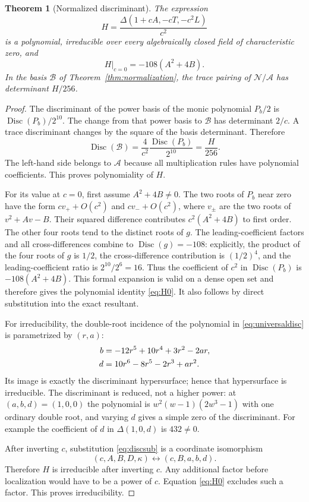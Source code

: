 \documentclass[11pt,a4paper]{article}
\newtheorem{theorem}{Theorem}[section]
\theoremstyle{definition}
\newcommand{\Disc}{\operatorname{Disc}}
\newcommand{\base}{\mathcal A}
\newcommand{\normal}{\mathcal N}
\newcommand{\kk}{\kappa}
\begin{document}
\begin{theorem}[Normalized discriminant]\label{thm:H}
The expression
\begin{equation}\label{eq:H}
 H=\frac{\Delta(1+cA,-cT,-c^2L)}{c^2}
\end{equation}
is a polynomial, irreducible over every algebraically closed field of
characteristic zero, and
\begin{equation}\label{eq:H0}
 H|_{c=0}=-108(A^2+4B).
\end{equation}
In the basis $\mathcal B$ of Theorem~\ref{thm:normalization}, the trace
pairing of $\normal/\base$ has determinant $H/256$.
\end{theorem}
\begin{proof}
The discriminant of the power basis of the monic polynomial $P_b/2$ is
$\Disc(P_b)/2^{10}$. The change from that power basis to $\mathcal B$
has determinant $2/c$. A trace discriminant changes by the square of
the basis determinant. Therefore
\begin{equation}\label{eq:discbasis}
 \Disc(\mathcal B)=\frac{4}{c^2}\frac{\Disc(P_b)}{2^{10}}
                 =\frac{H}{256}.
\end{equation}
The left-hand side belongs to $\base$ because all multiplication rules
have polynomial coefficients. This proves polynomiality of $H$.

For its value at $c=0$, first assume $A^2+4B\ne0$. The two roots of $P_b$
near zero have the form $cv_++O(c^2)$ and $cv_-+O(c^2)$, where
$v_\pm$ are the two roots of $v^2+Av-B$. Their squared difference
contributes $c^2(A^2+4B)$ to first order. The other four roots tend to
the distinct roots of $g$. The leading-coefficient factors and all
cross-differences combine to $\Disc(g)=-108$: explicitly, the product
of the four roots of $g$ is $1/2$, the cross-difference contribution is
$(1/2)^4$, and the leading-coefficient ratio is $2^{10}/2^6=16$.
Thus the coefficient of $c^2$ in $\Disc(P_b)$ is
$-108(A^2+4B)$. This formal expansion is valid on a dense open set and
therefore gives the polynomial identity \eqref{eq:H0}. It also follows
by direct substitution into the exact resultant.

For irreducibility, the double-root incidence of the polynomial in
\eqref{eq:universaldisc} is parametrized by $(r,a)$:
\begin{align}
 b&=-12r^5+10r^4+3r^2-2ar,\notag\\
 d&=10r^6-8r^5-2r^3+ar^2.\label{eq:incidence}
\end{align}
Its image is exactly the discriminant hypersurface; hence that
hypersurface is irreducible. The discriminant is reduced, not a higher
power: at $(a,b,d)=(1,0,0)$ the polynomial is
$w^2(w-1)(2w^3-1)$ with one ordinary double root, and varying $d$ gives
a simple zero of the discriminant. For example the coefficient of $d$
in $\Delta(1,0,d)$ is $432\ne0$.

After inverting $c$, substitution \eqref{eq:discsub} is a coordinate
isomorphism
\[
 (c,A,B,D,\kk)\longleftrightarrow(c,B,a,b,d).
\]
Therefore $H$ is irreducible after inverting $c$. Any additional factor
before localization would have to be a power of $c$. Equation
\eqref{eq:H0} excludes such a factor. This proves irreducibility.
\end{proof}
\end{document}
